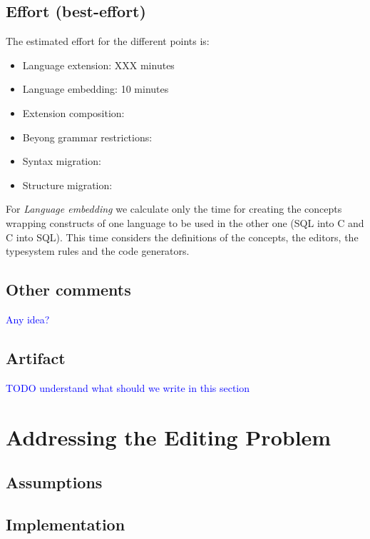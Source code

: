 \documentclass[preprint,numbers,10pt]{sigplanconf}
\newcommand\comment[1]{\textcolor{blue}{#1}}
\begin{document}
\subsection{Effort (best-effort)}

The estimated effort for the different points is:

\begin{itemize}
	\item Language extension: XXX minutes
	\item Language embedding: 10 minutes
	\item Extension composition:
	\item Beyong grammar restrictions:
	\item Syntax migration:
	\item Structure migration:
\end{itemize}

For \emph{Language embedding} we calculate only the time for creating the concepts wrapping constructs of one language to be used in the other one (SQL into C and C into SQL). This time considers the definitions of the concepts, the editors, the typesystem rules and the code generators.

\subsection{Other comments}

\comment{Any idea?}

\subsection{Artifact}

\comment{TODO understand what should we write in this section}

%
%

\section{Addressing the Editing Problem}

\subsection{Assumptions}

\subsection{Implementation}
\end{document}
